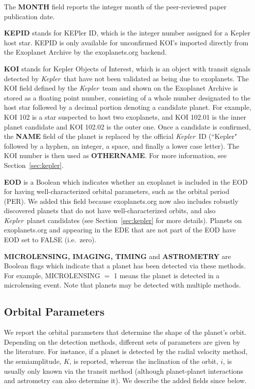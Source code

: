 \documentclass[11pt,preprint]{aastex}
\def\kepler{\textit{Kepler}}
\begin{document}
\begin{CJK*}{UTF8}{gbsn}
The {\bf MONTH} field reports the integer month of the
peer-reviewed paper publication date.

{\bf KEPID} stands for KEPler ID, which is the integer number assigned
for a Kepler host star. KEPID is only available for unconfirmed
KOI's imported directly from the Exoplanet Archive by the
exoplanets.org backend. 

{\bf KOI} stands for Kepler Objects of Interest, which is an object
with transit signals detected by \kepler\ that have not been validated
as being due to exoplanets.  The KOI field defined by the \kepler\
team and shown on the Exoplanet Archive is stored as a floating point
number, consisting of a whole number designated to the host star
followed by a decimal portion denoting a candidate planet. For example,
KOI 102 is a star suspected to host two exoplanets, and KOI 102.01 is
the inner planet candidate and KOI 102.02 is the outer one. Once a
candidate is confirmed, the {\bf NAME} field of the planet is replaced by
the official \kepler\ ID (``Kepler" followed by a hyphen, an integer,
a space, and finally a lower case letter). The KOI number is then used as
{\bf OTHERNAME}. For more information, see
Section~\ref{sec:kepler}.

{\bf EOD} is a Boolean which indicates whether an exoplanet is included
in the EOD for having well-characterized orbital
parameters, such as the orbital period (PER). We added this field because exoplanets.org
now also includes robustly discovered planets that do not have
well-characterized orbits, and also \kepler\ planet candidates (see
Section~\ref{sec:kepler} for more details).  Planets on exoplanets.org
and appearing in the EDE that are not part of the EOD have EOD set to
FALSE (i.e.\ zero).

{\bf MICROLENSING, IMAGING, TIMING} and {\bf ASTROMETRY} are Boolean flags which
indicate that a planet has been detected via these methods. For example,
MICROLENSING $=$ 1 means the planet is detected in a microlensing
event. Note that planets may be detected with multiple methods. 


\subsection{Orbital Parameters}\label{sec:orbit}

We report the orbital parameters that determine the shape of the
planet's orbit. Depending on the detection methods, different sets of
parameters are given by the literature. For instance, if a planet is
detected by the radial velocity method, the semiamplitude, $K$, is
reported, whereas the inclination of the orbit, $i$, is usually only known via the
transit method (although planet-planet interactions and astrometry can also determine it). We describe the added fields since \cite{Wright2011}
below.  


\end{CJK*}
\end{document}
